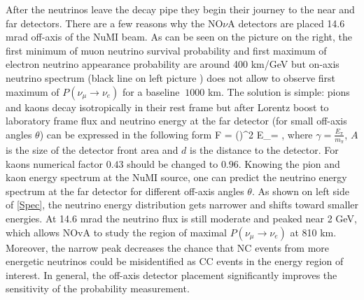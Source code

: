 After the neutrinos leave the decay pipe they begin their journey to the near and far detectors. 
There are a few reasons why the NO$\nu$A detectors are placed 14.6 mrad off-axis of the NuMI beam. 
As can be seen on the picture on the right, the first minimum of muon neutrino survival 
probability and first maximum of electron neutrino appearance probability are around 400 km/GeV 
but on-axis neutrino spectrum (black line on left picture ) does not allow to observe 
first maximum of $P(\nu_\mu \rightarrow \nu_e)$ for a baseline $~1000$ km. The solution is 
simple: pions and kaons decay isotropically in their rest frame but after Lorentz boost to 
laboratory frame flux and neutrino energy at the far detector (for small off-axis angles $\theta$) 
can be expressed in the following form
\be
F = \Big(\Big)^2
\ee
\be
E_\nu = ,
\ee
where $\gamma = \frac{E_\pi}{m_\pi}$, $A$ is the size of the detector front area and $d$ is 
the distance to the detector. For kaons numerical factor $0.43$ should be changed to $0.96$. 
Knowing the pion and kaon energy spectrum at the NuMI source, one can predict the neutrino energy 
spectrum at the far detector for different off-axis angles $\theta$. As shown on left side of 
\autoref{Spec}, the neutrino energy distribution gets narrower and shifts toward smaller energies. 
At 14.6 mrad the neutrino flux is still moderate and peaked near 2 GeV, which allows NOvA 
to study the region of maximal $P(\nu_\mu \rightarrow \nu_e)$ at 810 km. Moreover, the narrow 
peak decreases the chance that NC events from more energetic neutrinos could be misidentified 
as CC events in the energy region of interest. In general, the off-axis detector placement 
significantly improves the sensitivity of the probability measurement.
